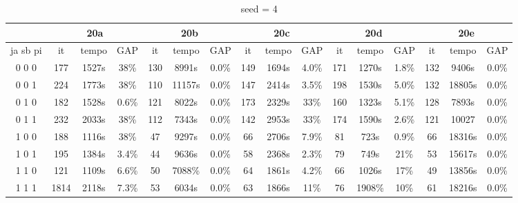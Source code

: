 \documentclass[12pt]{article}
\begin{document}
\begin{table}[!htb]
\centering
\footnotesize
\begin{tabular}{|c||c|c|c||c|c|c||c|c|c||c|c|c||c|c|c|}
\cline{2-16}
\multicolumn{1}{c||}{} & \multicolumn{3}{c||}{20a} & \multicolumn{3}{c||}{20b} & \multicolumn{3}{c||}{20c} & \multicolumn{3}{c||}{20d} & \multicolumn{3}{c|}{20e}\\
\hline
ja sb pi & it & tempo & GAP & it & tempo & GAP & it & tempo & GAP & it & tempo & GAP & it & tempo & GAP \\
\hline
0 0 0 & 177 & 1527s & 38\% & 130 & 8991s & 0.0\% & 149 & 1694s & 4.0\% & 171 & 1270s & 1.8\% & 132 & 9406s & 0.0\% \\
0 0 1 & 224 & 1773s & 38\% & 110 & 11157s & 0.0\% & 147 & 2414s & 3.5\% & 198 & 1530s & 5.0\% & 132 & 18805s & 0.0\% \\
0 1 0 & 182 & 1528s & 0.6\% & 121 & 8022s & 0.0\% & 173 & 2329s & 33\% & 160 & 1323s & 5.1\% & 128 & 7893s & 0.0\% \\
0 1 1 & 232 & 2033s & 38\% & 112 & 7343s & 0.0\% & 142 & 2953s & 33\% & 174 & 1590s & 2.6\% & 121 & 10027 & 0.0\% \\
1 0 0 & 188 & 1116s & 38\% & 47 & 9297s & 0.0\% & 66 & 2706s & 7.9\% & 81 & 723s & 0.9\% & 66 & 18316s & 0.0\% \\
1 0 1 & 195 & 1384s & 3.4\% & 44 & 9636s & 0.0\% & 58 & 2368s & 2.3\% & 79 & 749s & 21\% & 53 & 15617s & 0.0\% \\
1 1 0 & 121 & 1109s & 6.6\% & 50 & 7088\% & 0.0\% & 64 & 1861s & 4.2\% & 66 & 1026s & 17\% & 49 & 13856s & 0.0\% \\
1 1 1 & 1814 & 2118s & 7.3\% & 53 & 6034s & 0.0\% & 63 & 1866s & 11\% & 76 & 1908\% & 10\% & 61 & 18216s & 0.0\% \\
\hline
\end{tabular}
\caption{seed = 4}
\end{table}
\end{document}
